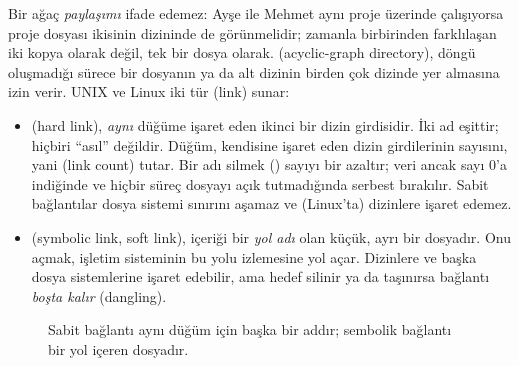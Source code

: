 Bir ağaç \emph{paylaşımı} ifade edemez: Ayşe ile Mehmet aynı proje üzerinde çalışıyorsa proje dosyası ikisinin dizininde de görünmelidir; zamanla birbirinden farklılaşan iki kopya olarak değil, tek bir dosya olarak.  (acyclic-graph directory), döngü oluşmadığı sürece bir dosyanın ya da alt dizinin birden çok dizinde yer almasına izin verir. UNIX ve Linux iki tür  (link) sunar:

\begin{itemize}
  \item {} (hard link), \emph{aynı} düğüme işaret eden ikinci bir dizin girdisidir. İki ad eşittir; hiçbiri ``asıl'' değildir. Düğüm, kendisine işaret eden dizin girdilerinin sayısını, yani  (link count) tutar. Bir adı silmek () sayıyı bir azaltır; veri ancak sayı $0$'a indiğinde ve hiçbir süreç dosyayı açık tutmadığında serbest bırakılır. Sabit bağlantılar dosya sistemi sınırını aşamaz ve (Linux'ta) dizinlere işaret edemez.
  \item {} (symbolic link, soft link), içeriği bir \emph{yol adı} olan küçük, ayrı bir dosyadır. Onu açmak, işletim sisteminin bu yolu izlemesine yol açar. Dizinlere ve başka dosya sistemlerine işaret edebilir, ama hedef silinir ya da taşınırsa bağlantı \emph{boşta kalır} (dangling).
\end{itemize}

\begin{figure}[H]
\centering
{}
\caption{Sabit bağlantı aynı düğüm için başka bir addır; sembolik bağlantı bir yol içeren dosyadır.}
\end{figure}

